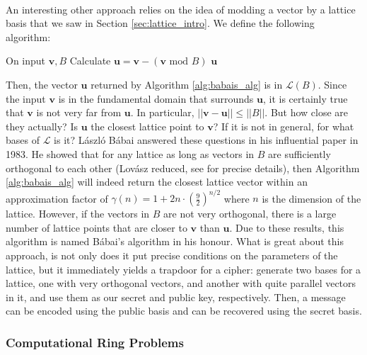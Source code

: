 \documentclass{article}
\theoremstyle{definition}
\theoremstyle{example}
\renewcommand{\L}{\mathcal{L}}
\renewcommand{\mod}{\,\,\text{mod}\,\,}
\renewcommand{\vec}[1]{\mathbf{#1}}
\newcommand{\norm}[1]{||#1||}
\begin{document}
\paragraph{} An interesting other approach relies on the idea of modding a
vector by a lattice basis that we saw in Section \ref{sec:lattice_intro}. We define the
following algorithm:
\begin{algorithm}[H]
  \caption{}
  \label{alg:babais_alg}
  \begin{algorithmic}
    \State On input $\vec{v}, B$
    \State Calculate $\vec{u} = \vec{v} - (\vec{v} \mod B)$
    \State \Return $\vec{u}$
  \end{algorithmic}
\end{algorithm}
Then, the vector $\vec{u}$ returned by Algorithm \ref{alg:babais_alg} is in $\L(B)$. Since
the input $\vec{v}$ is in the fundamental domain that surrounds $\vec{u}$, it is
certainly true that $\vec{v}$ is not very far from $\vec{u}$. In particular,
$\norm{\vec{v} - \vec{u}} \leq \norm{B}$. But how close are they actually? Is
$\vec{u}$ the closest lattice point to $\vec{v}$? If it is not in general, for
what bases of $\L$ is it? L\'aszl\'o B\'abai answered these questions in his
influential paper \cite{Babai1986} in 1983. He showed that for any lattice as long as vectors in $B$ are sufficiently
orthogonal to each other (Lov\'asz reduced, see \cite{lenstra1982factoring} for
precise details), then Algorithm \ref{alg:babais_alg} will indeed return the closest lattice
vector within an approximation factor of $\gamma(n) = 1 + 2n \cdot
(\frac92)^{n/2}$ where $n$ is the dimension of the lattice. However, if the
vectors in $B$ are not very orthogonal, there is a large number of lattice points that
are closer to $\vec{v}$ than $\vec{u}$. Due to these results, this algorithm is
named B\'abai's algorithm in his honour. What is great about this approach, is
not only does it put precise conditions on the parameters of the lattice, but it
immediately yields a trapdoor for a cipher: generate two bases for a lattice,
one with very orthogonal vectors, and another with quite parallel vectors in it,
and use them as our secret and public key, respectively. Then, a message can be
encoded using the public basis and can be recovered using the secret basis.
\subsubsection{Computational Ring Problems}
\end{document}
